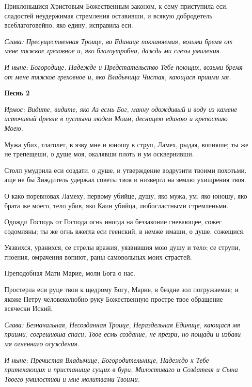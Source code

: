 Приклоньшися Христовым Божественным законом, к сему приступила еси, сладостей неудержимая стремления оставивши, и всякую добродетель всеблагоговейно, яко едину, исправила еси. 

\itshape Слава\normalfont{}: Пресущественная Троице, во Единице покланяемая, возьми бремя от мене тяжкое греховное и, яко благоутробна, даждь ми слезы умиления. 

\itshape И ныне\normalfont{}: Богородице, Надежде и Предстательство Тебе поющих, возьми бремя от мене тяжкое греховное и, яко Владычица Чистая, кающася приими мя. 


\medskip


\bfseries Песнь 2\normalfont{}

\itshape Ирмос\normalfont{}: Видите, видите, яко Аз есмь Бог, манну одождивый и воду из камене источивый древле в пустыни людем Моим, десницею единою и крепостию Моею. 

Мужа убих, глаголет, в язву мне и юношу в струп, Ламех, рыдая, вопияше; ты же не трепещеши, о душе моя, окалявши плоть и ум осквернивши. 

Столп умудрила еси создати, о душе, и утверждение водрузити твоими похотьми, аще не бы Зиждитель удержал советы твоя и низвергл на землю ухищрения твоя. 

О како поревновах Ламеху, первому убийце, душу, яко мужа, ум, яко юношу, яко брата же моего, тело убив, яко Каин убийца, любосластными стремленьми. 

Одожди Господь от Господа огнь иногда на беззаконие гневающее, сожег содомляны; ты же огнь вжегла еси геенский, в немже имаши, о душе, сожещися. 

Уязвихся, уранихся, се стрелы вражия, уязвившия мою душу и тело; се струпи, гноения, омрачения вопиют, раны самовольных моих страстей. 

\bfseries 

Преподобная Мати Марие, моли Бога о нас.

\normalfont{}

Простерла еси руце твои к щедрому Богу, Марие, в бездне зол погружаемая; и якоже Петру человеколюбно руку Божественную простре твое обращение всячески Иский. 

\itshape Слава\normalfont{}: Безначальная, Несозданная Троице, Нераздельная Единице, кающася мя приими, согрешивша спаси, Твое есмь создание, не презри, но пощади и избави мя огненнаго осуждения. 

\itshape И ныне\normalfont{}: Пречистая Владычице, Богородительнице, Надеждо к Тебе притекающих и пристанище сущих в бури, Милостиваго и Создателя и Сына Твоего умилостиви и мне молитвами Твоими.


